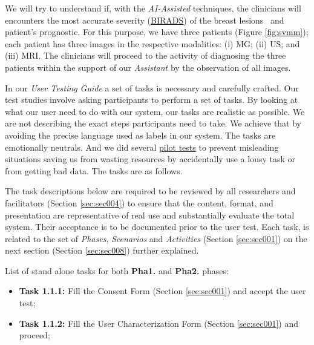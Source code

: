 \hfill


We will try to understand if, with the \textit{AI-Assisted} techniques, the clinicians will encounters the most accurate severity (\hyperlink{https://en.wikipedia.org/wiki/BI-RADS}{BIRADS}) of the breast lesions~\cite{american1998breast} and patient's prognostic. For this purpose, we have three patients (Figure \ref{fig:svmm}); each patient has three images in the respective modalities: (i) MG; (ii) US; and (iii) MRI. The clinicians will proceed to the activity of diagnosing the three patients within the support of our \textit{Assistant} by the observation of all images.

\hfill

In our \textit{User Testing Guide} a set of tasks is necessary and carefully crafted. Our test studies involve asking participants to perform a set of tasks. By looking at what our user need to do with our system, our tasks are realistic as possible. We are not describing the exact steps participants need to take. We achieve that by avoiding the precise language used as labels in our system. The tasks are emotionally neutrals. And we did several \hyperlink{https://www.nngroup.com/articles/pilot-testing/}{pilot tests} to prevent misleading situations saving us from wasting resources by accidentally use a lousy task or from getting bad data. The tasks are as follows.

The task descriptions below are required to be reviewed by all researchers and facilitators (Section \ref{sec:sec004}) to ensure that the content, format, and presentation are representative of real use and substantially evaluate the total system. Their acceptance is to be documented prior to the user test. Each task, is related to the set of {\it Phases}, {\it Scenarios} and {\it Activities} (Section \ref{sec:sec001}) on the next section (Section \ref{sec:sec008}) further explained.

\clearpage


List of stand alone tasks for both {\bf Pha1.} and {\bf Pha2.} phases:


\hfill

\begin{itemize}
\item[] \textbf{Task 1.1.1:} Fill the Consent Form (Section \ref{sec:sec001}) and accept the user test;
\item[] \textbf{Task 1.1.2:} Fill the User Characterization Form (Section \ref{sec:sec001}) and proceed;
\end{itemize}


